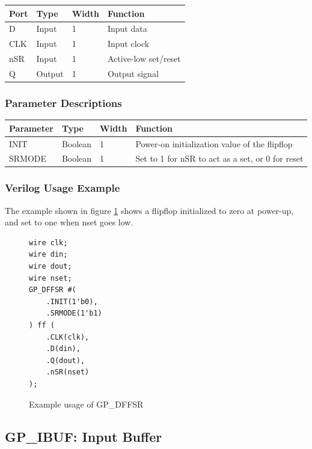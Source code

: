 \documentclass[11pt]{article}
\begin{document}
\begin{tabularx}{4in}{|l|l|l|X|}
\hline
{\bfseries Port} & {\bfseries Type} & {\bfseries Width} & {\bfseries Function} \\
\hline
D & Input & 1 & Input data \\
\hline
CLK & Input & 1 & Input clock \\
\hline
nSR & Input & 1 & Active-low set/reset \\
\hline
Q & Output & 1 & Output signal \\
\hline
\end{tabularx}

\subsubsection{Parameter Descriptions}

\begin{tabularx}{5in}{|l|l|l|X|}
\hline
{\bfseries Parameter} & {\bfseries Type} & {\bfseries Width} & {\bfseries Function} \\
\hline
INIT & Boolean & 1 & Power-on initialization value of the flipflop \\
\hline
SRMODE & Boolean & 1 & Set to 1 for nSR to act as a set, or 0 for reset \\
\hline
\end{tabularx}

\subsubsection{Verilog Usage Example}

The example shown in figure \ref{gp-dffsr-example} shows a flipflop initialized to zero at power-up, and set to one
when nset goes low.

\begin{figure}[h]
\begin{lstlisting}
wire clk;
wire din;
wire dout;
wire nset;
GP_DFFSR #(
	.INIT(1'b0),
	.SRMODE(1'b1)
) ff (
	.CLK(clk),
	.D(din),
	.Q(dout),
	.nSR(nset)
);
\end{lstlisting}
\caption{Example usage of GP\_DFFSR}
\label{gp-dffsr-example}
\end{figure}


\pagebreak
\subsection{GP\_IBUF: Input Buffer}
\end{document}
